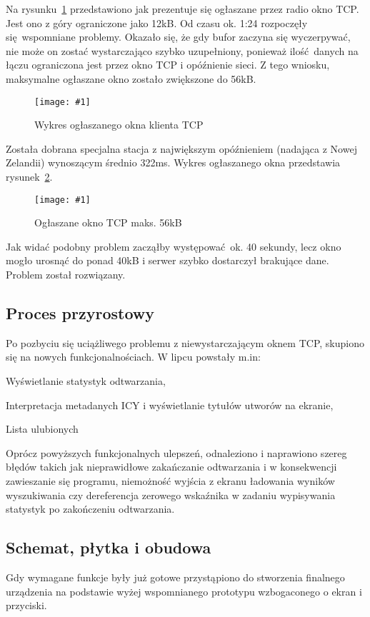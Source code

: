 \documentclass[polish]{aghengthesis}
\let\tempone\itemize
\let\temptwo\enditemize
\renewenvironment{itemize}{\tempone\setlength{\itemsep}{0cm}}{\temptwo}
\newcommand{\imgint}[4]{
	\begin{figure}[{#4}]
		\centering
		\texttt{[image: \#1]}
		\caption{#2}
		\label{#1}
	\end{figure}
}
\newcommand{\imgh}[3]{\imgint{#1}{#2}{#3}{H}}
\begin{document}
			Na rysunku~\ref{4/tcp_fail} przedstawiono jak prezentuje się ogłaszane przez radio okno TCP. Jest ono z góry ograniczone jako 12kB. Od czasu ok. 1:24 rozpoczęły się wspomniane problemy. Okazało się, że gdy bufor zaczyna się wyczerpywać, nie może on zostać wystarczająco szybko uzupełniony, ponieważ ilość danych na łączu ograniczona jest przez okno TCP i opóźnienie sieci. Z tego wniosku, maksymalne ogłaszane okno zostało zwiększone do 56kB.
			\imgh{4/tcp_fail}{Wykres ogłaszanego okna klienta TCP}{0.85}
			
			Została dobrana specjalna stacja z największym opóźnieniem (nadająca z Nowej Zelandii) wynoszącym średnio 322ms. Wykres ogłaszanego okna przedstawia rysunek~\ref{4/tcp_good}.
			
			\imgh{4/tcp_good}{Ogłaszane okno TCP maks. 56kB}{0.6}

			Jak widać podobny problem zacząłby występować ok. 40 sekundy, lecz okno mogło urosnąć do ponad 40kB i serwer szybko dostarczył brakujące dane. Problem został rozwiązany.
			
		\subsection{Proces przyrostowy}
			Po pozbyciu się uciążliwego problemu z niewystarczającym oknem TCP, skupiono się na nowych funkcjonalnościach. W lipcu powstały m.in:
			\begin{itemize}
				\item Wyświetlanie statystyk odtwarzania,
				\item Interpretacja metadanych ICY i wyświetlanie tytułów utworów na ekranie,
				\item Lista ulubionych
			\end{itemize}
			
			Oprócz powyższych funkcjonalnych ulepszeń, odnaleziono i naprawiono szereg błędów takich jak nieprawidłowe zakańczanie odtwarzania i w konsekwencji zawieszanie się programu, niemożność wyjścia z ekranu ładowania wyników wyszukiwania czy dereferencja zerowego wskaźnika w zadaniu wypisywania statystyk po zakończeniu odtwarzania.
			
		\subsection{Schemat, płytka i obudowa}
			Gdy wymagane funkcje były już gotowe przystąpiono do stworzenia finalnego urządzenia na podstawie wyżej wspomnianego prototypu wzbogaconego o ekran i przyciski.
			$ $\\
			
\end{document}

